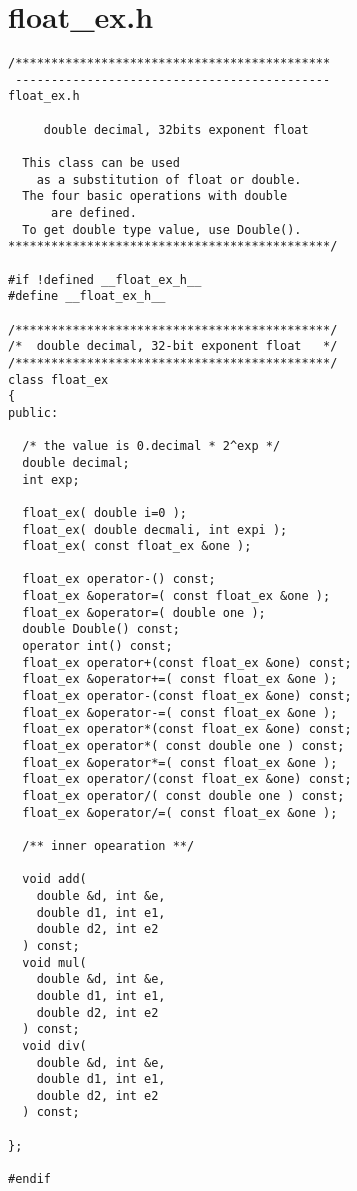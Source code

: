 \section{float\_ex.h}
\begin{verbatim}
/********************************************
 --------------------------------------------
float_ex.h

     double decimal, 32bits exponent float

  This class can be used
    as a substitution of float or double.
  The four basic operations with double
      are defined.
  To get double type value, use Double().
*********************************************/

#if !defined __float_ex_h__
#define __float_ex_h__

/********************************************/
/*  double decimal, 32-bit exponent float   */
/********************************************/
class float_ex
{
public:

  /* the value is 0.decimal * 2^exp */
  double decimal;
  int exp;

  float_ex( double i=0 );
  float_ex( double decmali, int expi );
  float_ex( const float_ex &one );

  float_ex operator-() const;
  float_ex &operator=( const float_ex &one );
  float_ex &operator=( double one );
  double Double() const;
  operator int() const;
  float_ex operator+(const float_ex &one) const;
  float_ex &operator+=( const float_ex &one );
  float_ex operator-(const float_ex &one) const;
  float_ex &operator-=( const float_ex &one );
  float_ex operator*(const float_ex &one) const;
  float_ex operator*( const double one ) const;
  float_ex &operator*=( const float_ex &one );
  float_ex operator/(const float_ex &one) const;
  float_ex operator/( const double one ) const;
  float_ex &operator/=( const float_ex &one );

  /** inner opearation **/

  void add(
    double &d, int &e,
    double d1, int e1,
    double d2, int e2
  ) const;
  void mul(
    double &d, int &e,
    double d1, int e1,
    double d2, int e2
  ) const;
  void div(
    double &d, int &e,
    double d1, int e1,
    double d2, int e2
  ) const;

};

#endif
\end{verbatim}
